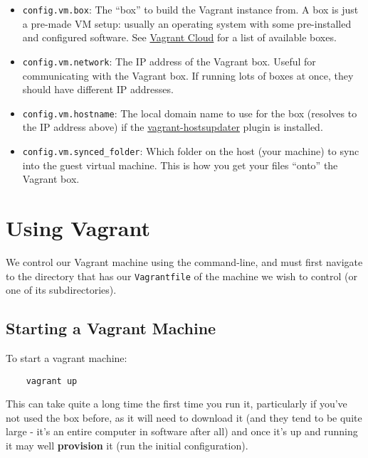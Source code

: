 \begin{itemize}

    \item \texttt{config.vm.box}: The ``box'' to build the Vagrant instance from. A box is just a pre-made VM setup: usually an operating system with some pre-installed and configured software. See \href{https://app.vagrantup.com/boxes/search}{Vagrant Cloud} for a list of available boxes.

    \item \texttt{config.vm.network}: The IP address of the Vagrant box. Useful for communicating with the Vagrant box. If running lots of boxes at once, they should have different IP addresses.

    \item \texttt{config.vm.hostname}: The local domain name to use for the box (resolves to the IP address above) if the \href{https://github.com/cogitatio/vagrant-hostsupdater}{vagrant-hostsupdater} plugin is installed.

    \item \texttt{config.vm.synced\_folder}: Which folder on the host (your machine) to sync into the guest virtual machine. This is how you get your files ``onto'' the Vagrant box.

\end{itemize}


\section{Using Vagrant}

We control our Vagrant machine using the command-line, and must first navigate to the directory that has our \texttt{Vagrantfile} of the machine we wish to control (or one of its subdirectories).

\subsection{Starting a Vagrant Machine}

To start a vagrant machine:

\begin{verbatim}
    vagrant up
\end{verbatim}

This can take quite a long time the first time you run it, particularly if you've not used the box before, as it will need to download it (and they tend to be quite large - it's an entire computer in software after all) and once it's up and running it may well \textbf{provision} it (run the initial configuration).
\\

